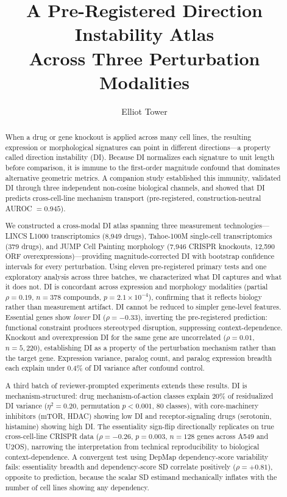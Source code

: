 \documentclass[11pt]{article}
\title{A Pre-Registered Direction Instability Atlas\\
Across Three Perturbation Modalities}
\author{Elliot Tower}
\affil{Independent researcher \\ \texttt{elliot@elliottower.ai}}
\date{}
\begin{document}
\maketitle

\begin{abstract}
When a drug or gene knockout is applied across many cell lines, the
resulting expression or morphological signatures can point in different
directions---a property called direction instability (DI).  Because DI
normalizes each signature to unit length before comparison, it is immune
to the first-order magnitude confound that dominates alternative
geometric metrics.  A companion study established this immunity, validated
DI through three independent non-cosine biological channels, and showed
that DI predicts cross-cell-line mechanism transport (pre-registered,
construction-neutral AUROC $= 0.945$).

We constructed a cross-modal DI atlas spanning three measurement
technologies---LINCS L1000 transcriptomics (8{,}949 drugs), Tahoe-100M
single-cell transcriptomics (379 drugs), and JUMP Cell Painting
morphology (7{,}946 CRISPR knockouts, 12{,}590 ORF
overexpressions)---providing magnitude-corrected DI with bootstrap
confidence intervals for every perturbation.  Using eleven pre-registered
primary tests and one exploratory analysis across three batches, we
characterized what DI captures and what it does not.  DI is
concordant across expression and morphology modalities (partial
$\rho = 0.19$, $n = 378$ compounds, $p = 2.1 \times 10^{-4}$),
confirming that it reflects biology rather than measurement artifact.
DI cannot be reduced to simpler gene-level features.
Essential genes show \emph{lower} DI ($\rho = -0.33$), inverting the
pre-registered prediction: functional constraint produces stereotyped
disruption, suppressing context-dependence.  Knockout and overexpression
DI for the same gene are uncorrelated ($\rho = 0.01$,
$n = 5{,}220$), establishing DI as a property of the perturbation
mechanism rather than the target gene.  Expression variance, paralog
count, and paralog expression breadth each explain under 0.4\% of DI
variance after confound control.

A third batch of reviewer-prompted experiments extends these results.
DI is mechanism-structured: drug mechanism-of-action classes explain
20\% of residualized DI variance ($\eta^2 = 0.20$, permutation
$p < 0.001$, 80 classes), with core-machinery inhibitors (mTOR, HDAC)
showing low DI and receptor-signaling drugs (serotonin, histamine)
showing high DI.  The essentiality sign-flip directionally replicates on
true cross-cell-line CRISPR data ($\rho = -0.26$, $p = 0.003$,
$n = 128$ genes across A549 and U2OS), narrowing the interpretation from
technical reproducibility to biological context-dependence.  A convergent
test using DepMap dependency-score variability fails: essentiality
breadth and dependency-score SD correlate positively
($\rho = +0.81$), opposite to prediction, because the scalar SD
estimand mechanically inflates with the number of cell lines showing
any dependency.


\end{abstract}
\end{document}
